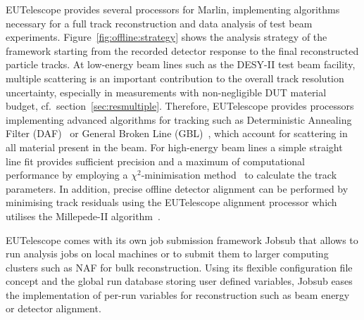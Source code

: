 EUTelescope provides several processors for Marlin, implementing algorithms necessary for a full track reconstruction and data analysis of test beam experiments. 
Figure~\ref{fig:offline:strategy} shows the analysis strategy of the framework starting from the recorded detector response to the final reconstructed particle tracks. 
At low-energy beam lines such as the DESY-II test beam facility, multiple scattering is an important contribution to the overall track resolution uncertainty,
 especially in measurements with non-negligible DUT material budget, cf.\ section~\ref{sec:resmultiple}.
Therefore, EUTelescope provides processors implementing advanced algorithms for tracking such as Deterministic Annealing Filter (DAF)~\cite{ref:daffitter}
 or General Broken Line (GBL)~\cite{Blobel20111760,Kleinwort-2012}, which account for scattering in all material present in the beam.
For high-energy beam lines a simple straight line fit provides sufficient precision and a maximum of computational performance by employing a $\chi^{2}$-minimisation method~\cite{ref:eudetmemo_2007_01,ref:lutzpaper} to calculate the track parameters.
In addition, precise offline detector alignment can be performed by minimising track residuals using the EUTelescope alignment processor which utilises the Millepede-II algorithm~\cite{Blobel-2006}.

EUTelescope comes with its own job submission framework Jobsub that allows to run analysis jobs on local machines or to submit them to larger computing clusters such as NAF for bulk reconstruction.
Using its flexible configuration file concept and the global run database storing user defined variables,
 Jobsub eases the implementation of per-run variables for reconstruction such as beam energy or detector alignment.